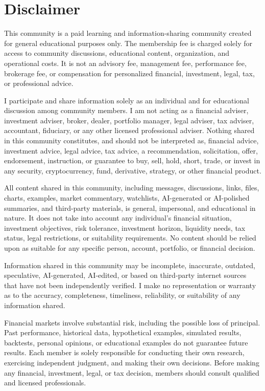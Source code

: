 \documentclass[11pt]{ctexart}
\begin{document}
\section{Disclaimer}
{\scriptsize\color{refgray}
This community is a paid learning and information-sharing community created for general educational purposes only. The membership fee is charged solely for access to community discussions, educational content, organization, and operational costs. It is not an advisory fee, management fee, performance fee, brokerage fee, or compensation for personalized financial, investment, legal, tax, or professional advice.\par
I participate and share information solely as an individual and for educational discussion among community members. I am not acting as a financial adviser, investment adviser, broker, dealer, portfolio manager, legal adviser, tax adviser, accountant, fiduciary, or any other licensed professional adviser. Nothing shared in this community constitutes, and should not be interpreted as, financial advice, investment advice, legal advice, tax advice, a recommendation, solicitation, offer, endorsement, instruction, or guarantee to buy, sell, hold, short, trade, or invest in any security, cryptocurrency, fund, derivative, strategy, or other financial product.\par
All content shared in this community, including messages, discussions, links, files, charts, examples, market commentary, watchlists, AI-generated or AI-polished summaries, and third-party materials, is general, impersonal, and educational in nature. It does not take into account any individual's financial situation, investment objectives, risk tolerance, investment horizon, liquidity needs, tax status, legal restrictions, or suitability requirements. No content should be relied upon as suitable for any specific person, account, portfolio, or financial decision.\par
Information shared in this community may be incomplete, inaccurate, outdated, speculative, AI-generated, AI-edited, or based on third-party internet sources that have not been independently verified. I make no representation or warranty as to the accuracy, completeness, timeliness, reliability, or suitability of any information shared.\par
Financial markets involve substantial risk, including the possible loss of principal. Past performance, historical data, hypothetical examples, simulated results, backtests, personal opinions, or educational examples do not guarantee future results. Each member is solely responsible for conducting their own research, exercising independent judgment, and making their own decisions. Before making any financial, investment, legal, or tax decision, members should consult qualified and licensed professionals.\par
}
\end{document}
